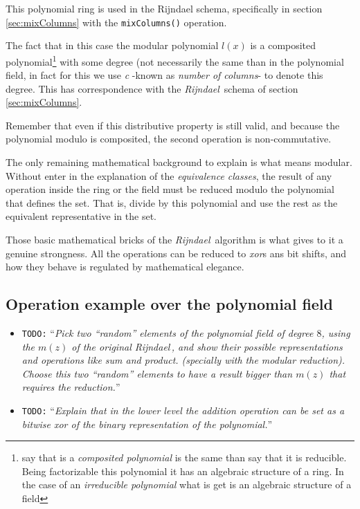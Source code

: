 \documentclass[10pt,a4paper,twoside]{llncs}
\newcommand{\todo}[1]{\texttt{\color{red}TODO:} ``\emph{#1}''}
\newcommand{\rijndael}{\emph{Rijndael}}
\begin{document}
This polynomial ring is used in the Rijndael schema, specifically in section \ref{sec:mixColumns} with the {\tt mixColumns()} operation.

The fact that in this case the modular polynomial $l(x)$ is a composited polynomial\footnote{say that is a \emph{composited polynomial} is the same than say that it is reducible. Being factorizable this polynomial it has an algebraic structure of a ring. In the case of an \emph{irreducible polynomial} what is get is an algebraic structure of a field} with some degree (not necessarily the same than in the polynomial field, in fact for this we use \emph{c} -known as \emph{number of columns}- to denote this degree. This has correspondence with the \rijndael\, schema of section \ref{sec:mixColumns}.

Remember that even if this distributive property is still valid, and because the polynomial modulo is composited, the second operation is non-commutative.

The only remaining mathematical background to explain is what means modular. Without enter in the explanation of the \emph{equivalence classes}, the result of any operation inside the ring or the field must be reduced modulo the polynomial that defines the set. That is, divide by this polynomial and use the rest as the equivalent representative in the set.

Those basic mathematical bricks of the \rijndael\, algorithm is what gives to it a genuine strongness. All the operations can be reduced to \emph{xor}s ans bit shifts, and how they behave is regulated by mathematical elegance. 

\subsection{Operation example over the polynomial field}\label{sec:polynomialField}

\begin{itemize}
 \item \todo{Pick two ``random'' elements of the polynomial field of degree $8$, using the $m(z)$ of the original \rijndael\,, and show their possible representations and operations like sum and product. (specially with the modular reduction). Choose this two ``random'' elements to have a result bigger than $m(z)$ that requires the reduction.}
 \item \todo{Explain that in the lower level the addition operation can be set as a bitwise \emph{xor} of the binary representation of the polynomial.}
\end{itemize}
\end{document}
